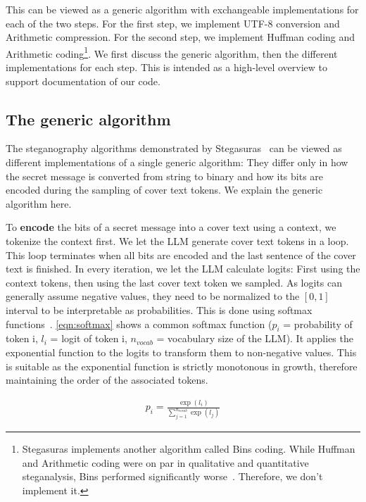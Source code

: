 This can be viewed as a generic algorithm with exchangeable implementations for each of the two steps. For the first step, we implement UTF-8 conversion and Arithmetic compression. For the second step, we implement Huffman coding and Arithmetic coding\footnote{Stegasuras implements another algorithm called Bins coding. While Huffman and Arithmetic coding were on par in qualitative and quantitative steganalysis, Bins performed significantly worse~\cite{zieglerNeuralLinguisticSteganography2019}. Therefore, we don't implement it.}. We first discuss the generic algorithm, then the different implementations for each step. This is intended as a high-level overview to support documentation of our code.

\subsection{The generic algorithm}
\label{sec:theGenericAlgorithm}
The steganography algorithms demonstrated by Stegasuras~\cite{zieglerNeuralLinguisticSteganography2019} can be viewed as different implementations of a single generic algorithm: They differ only in how the secret message is converted from string to binary and how its bits are encoded during the sampling of cover text tokens. We explain the generic algorithm here.

To \textbf{encode} the bits of a secret message into a cover text using a context, we tokenize the context first. We let the \gls{LLM} generate cover text tokens in a loop. This loop terminates when all bits are encoded and the last sentence of the cover text is finished. In every iteration, we let the \gls{LLM} calculate logits: First using the context tokens, then using the last cover text token we sampled. As logits can generally assume negative values, they need to be normalized to the $ [0, 1] $ interval to be interpretable as probabilities. This is done using softmax functions~\cite{turnerIntroductionTransformers2024}. \cref{eqn:softmax} shows a common softmax function ($p_i$ = probability of token i, $l_i$ = logit of token i, $n_{vocab}$ = vocabulary size of the \gls{LLM}). It applies the exponential function to the logits to transform them to non-negative values. This is suitable as the exponential function is strictly monotonous in growth, therefore maintaining the order of the associated tokens.

\begin{align}
	p_i = \frac{\exp(l_i)}{\sum_{j=1}^{n_{vocab}} \exp(l_j)}
	\label{eqn:softmax}
\end{align}

